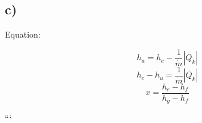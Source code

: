 

\subsection*{c)}

\begin{description}
    \item[Equation:] 
    \[
    h_a = h_e - \frac{1}{\dot{m}} \left| \dot{Q_k} \right|
    \]
    \[
    h_e - h_u = \frac{1}{\dot{m}} \left| \dot{Q_k} \right|
    \]
    \[
    x = \frac{h_e - h_f}{h_g - h_f}
    \]
\end{description}

```